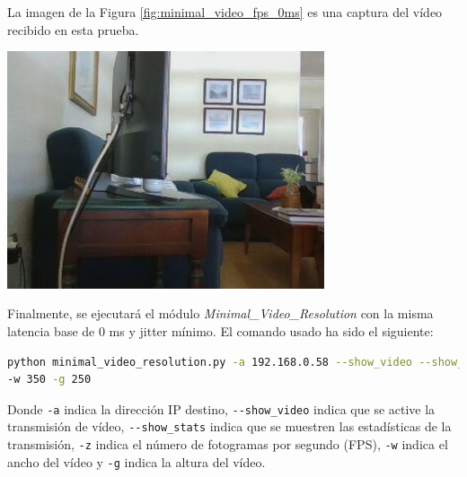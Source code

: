 \newpage
La imagen de la Figura \ref{fig:minimal_video_fps_0ms} es una captura del vídeo recibido en esta prueba.
\begin{center}
  \includegraphics[width = 0.7\textwidth]{images/VideoRecibido4.2.png}
  \label{fig:minimal_video_fps_0ms}
\end{center}
\newpage

Finalmente, se ejecutará el módulo \textit{Minimal\_Video\_Resolution} con la misma latencia base de 0 ms y jitter mínimo. El comando usado ha sido el siguiente:

\begin{lstlisting}[language=bash,basicstyle=\ttfamily\scriptsize]
python minimal_video_resolution.py -a 192.168.0.58 --show_video --show_stats -z 12 \\
-w 350 -g 250
\end{lstlisting}
Donde \verb|-a| indica la dirección IP destino, \verb|--show_video| indica que se active la transmisión de vídeo, \verb|--show_stats| indica que se muestren las estadísticas de la transmisión, \verb|-z| indica el número de fotogramas por segundo (FPS), \verb|-w| indica el ancho del vídeo y \verb|-g| indica la altura del vídeo.
\vspace{\baselineskip}

